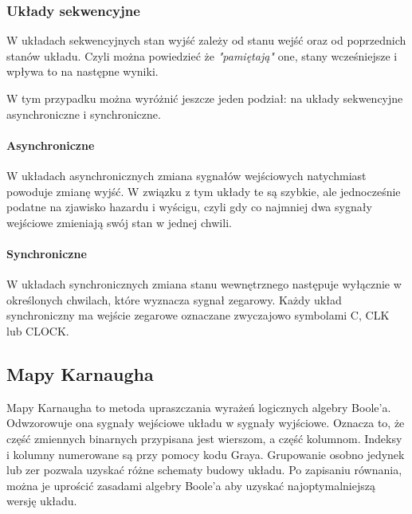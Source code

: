 \documentclass{article}
\begin{document}
      
      \subsubsection{Układy sekwencyjne}
        W układach sekwencyjnych stan wyjść zależy od stanu wejść oraz od poprzednich stanów układu.
        Czyli można powiedzieć że \textit{"pamiętają"} one, stany wcześniejsze i wpływa to na następne wyniki.

        W tym przypadku można wyróżnić jeszcze jeden podział: na układy sekwencyjne asynchroniczne i synchroniczne.
        \paragraph{Asynchroniczne}
          \mbox{}\newline
          W układach asynchronicznych zmiana sygnałów wejściowych natychmiast powoduje zmianę wyjść. W związku z tym układy te są szybkie, ale jednocześnie podatne na zjawisko hazardu i wyścigu, czyli gdy co najmniej dwa sygnały wejściowe zmieniają swój stan w jednej chwili.

        \paragraph{Synchroniczne}
          \mbox{}\newline
          W układach synchronicznych zmiana stanu wewnętrznego następuje wyłącznie w określonych chwilach, które wyznacza sygnał zegarowy. Każdy układ synchroniczny ma wejście zegarowe oznaczane zwyczajowo symbolami C, CLK lub CLOCK.
    
    \subsection{Mapy Karnaugha}
    Mapy Karnaugha to metoda upraszczania wyrażeń logicznych algebry Boole'a. Odwzorowuje ona sygnały wejściowe układu w sygnały wyjściowe. Oznacza to, że część zmiennych binarnych przypisana jest wierszom, a część kolumnom. Indeksy i kolumny numerowane są przy pomocy kodu Graya.
    Grupowanie osobno jedynek lub zer pozwala uzyskać różne schematy budowy układu. Po zapisaniu równania, można je uprościć zasadami algebry Boole'a aby uzyskać najoptymalniejszą wersję układu.
\end{document}
